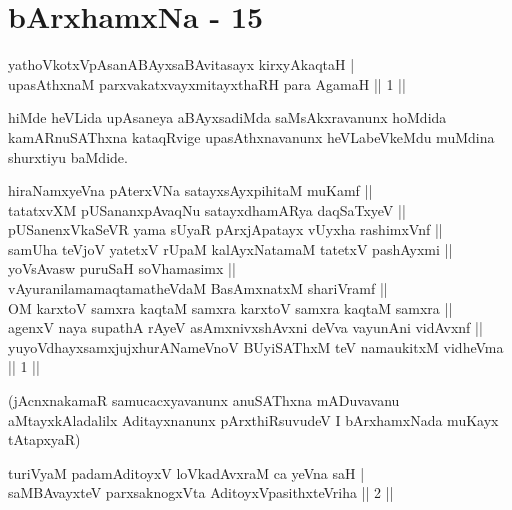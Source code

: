 \chapter{bArxhamxNa - 15}


\begin{shl}
yathoVkotxVpAsanABAyxsaBAvitasayx kirxyAkaqtaH | \\
upasAthxnaM parxvakatxvayxmitayxthaRH para AgamaH \hfill||  1 || 
\end{shl}

\begin{artha} 
hiMde heVLida upAsaneya aBAyxsadiMda saMsAkxravanunx hoMdida 
kamARnuSAThxna kataqRvige upasAthxnavanunx heVLabeVkeMdu muMdina 
shurxtiyu baMdide.\\
\begin{kandikeshl}
hiraNamxyeVna pAterxVNa satayxsAyxpihitaM muKamf ||\\ tatatxvXM pUSananxpAvaqNu satayxdhamARya daqSaTxyeV ||\\pUSanenxVkaSeVR yama sUyaR pArxjApatayx vUyxha rashimxVnf ||\\samUha teVjoV yatetxV rUpaM kalAyxNatamaM tatetxV pashAyxmi ||\\ yoV\s sAvasw puruSaH soV\s hamasimx ||\\ vAyuranilamamaqtamatheVdaM BasAmxnatxM shariVramf ||\\ OM karxtoV samxra kaqtaM samxra karxtoV samxra kaqtaM samxra ||\\ agenxV naya supathA rAyeV asAmxnivxshAvxni deVva vayunAni vidAvxnf ||\\ yuyoVdhayxsamxjujxhurANameVnoV BUyiSAThxM teV namaukitxM vidheVma || 1 ||
\end{kandikeshl}
(jAcnxnakamaR samucacxyavanunx anuSAThxna mADuvavanu aMtayxkAladalilx 
Aditayxnanunx pArxthiRsuvudeV I bArxhamxNada muKayx tAtapxyaR)
\end{artha}


\begin{shl}
turiVyaM padamAditoyxV loVkadAvxraM ca yeVna saH | \\
saMBAvayxteV parxsaknogxV\s ta AditoyxVpasithxteVriha \hfill||  2 || 
\end{shl}

